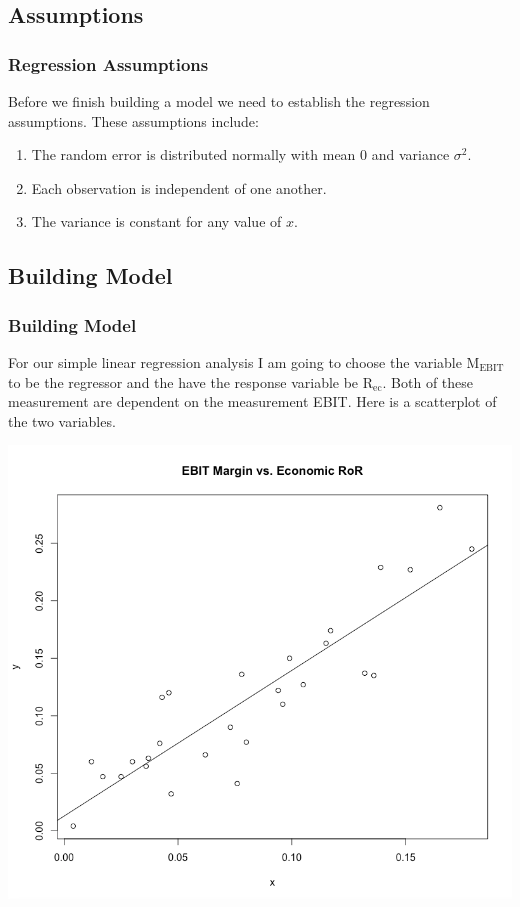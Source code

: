 \documentclass[12pt]{beamer}
\begin{document}
\subsection{Assumptions}
\begin{frame}
\frametitle{Regression Assumptions}
Before we finish building a model we need to establish the regression assumptions. These assumptions include:
\begin{enumerate}
\item The random error is distributed normally with mean 0 and variance $\sigma^2$.
\item Each observation is independent of one another.
\item The variance is constant for any value of $x$.
\end{enumerate}
\end{frame}

\subsection{Building Model}
\begin{frame}
\frametitle{Building Model}
For our simple linear regression analysis I am going to choose the variable $\text{M}_{\text{EBIT}}$ to be the regressor and the have the response variable be $\text{R}_{\text{ec}}$. Both of these measurement are dependent on the measurement EBIT. Here is a scatterplot of the two variables.
\begin{center}
\includegraphics[scale=0.2]{SLRplot.png}
\end{center}
\end{frame}
\end{document}
